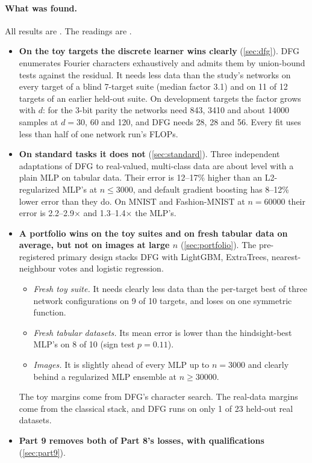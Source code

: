\paragraph{What was found.} All results are . The readings are .
\begin{itemize}
\item \textbf{On the toy targets the discrete learner wins clearly} (\cref{sec:dfg}). DFG enumerates Fourier characters exhaustively and admits them by union-bound tests against the residual. It needs less data than the study's networks on every target of a blind 7-target suite (median factor 3.1) and on 11 of 12 targets of an earlier held-out suite. On development targets the factor grows with $d$: for the 3-bit parity the networks need 843, 3410 and about 14000 samples at $d=30$, 60 and 120, and DFG needs 28, 28 and 56. Every fit uses less than half of one network run's FLOPs.
\item \textbf{On standard tasks it does not} (\cref{sec:standard}). Three independent adaptations of DFG to real-valued, multi-class data are about level with a plain MLP on tabular data. Their error is 12--17\% higher than an L2-regularized MLP's at $n\le3000$, and default gradient boosting has 8--12\% lower error than they do. On MNIST and Fashion-MNIST at $n=60000$ their error is 2.2--2.9$\times$ and 1.3--1.4$\times$ the MLP's.
\item \textbf{A portfolio wins on the toy suites and on fresh tabular data on average, but not on images at large $n$} (\cref{sec:portfolio}). The pre-registered primary design stacks DFG with LightGBM, ExtraTrees, nearest-neighbour votes and logistic regression.
  \begin{itemize}
  \item \emph{Fresh toy suite.} It needs clearly less data than the per-target best of three network configurations on 9 of 10 targets, and loses on one symmetric function.
  \item \emph{Fresh tabular datasets.} Its mean error is lower than the hindsight-best MLP's on 8 of 10 (sign test $p=0.11$).
  \item \emph{Images.} It is slightly ahead of every MLP up to $n=3000$ and clearly behind a regularized MLP ensemble at $n\ge30000$.
  \end{itemize}
  The toy margins come from DFG's character search. The real-data margins come from the classical stack, and DFG runs on only 1 of 23 held-out real datasets.
\item \textbf{Part 9 removes both of Part 8's losses, with qualifications} (\cref{sec:part9}).

\end{itemize}
